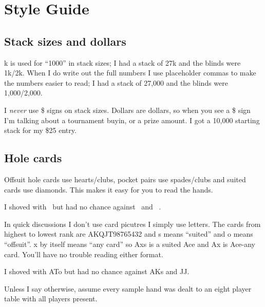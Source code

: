 \chapter{Style Guide}


\section*{Stack sizes and dollars}

k is used for ``1000'' in stack sizes; I had a stack of 27k and the
blinds were 1k/2k. When I do write out the full numbers I use
placeholder commas to make the numbers easier to read; I had a stack
of 27,000 and the blinds were 1,000/2,000.

I \textit{never} use \$ signs on stack sizes. Dollars are dollars, so
when you see a \$ sign I'm talking about a tournament buyin, or a
prize amount. I got a 10,000 starting stack for my \$25 entry.


\section*{Hole cards}

Offsuit hole cards use hearts/clubs, pocket pairs use spades/clubs and
suited cards use diamonds. This makes it easy for you to read the hands.

I shoved with \Ah\tenc\ but had no chance against \Ad\Kd\ and \Js\Jc\ .

In quick discussions I don't use card picutres I simply use
letters. The cards from highest to lowest rank are AKQJT98765432 and s
means ``suited'' and o means ``offsuit''. x by itself means ``any
card'' so Axs is a suited Ace and Ax is Ace-any card. You'll have no
trouble reading either format.

I shoved with ATo but had no chance against AKs and JJ.

Unless I say otherwise, assume every sample hand was dealt to an eight
player table with all players present.

